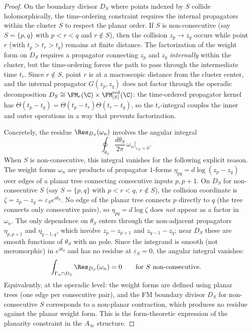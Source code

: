 \begin{proof}
On the boundary divisor $D_S$ where points indexed by $S$ collide holomorphically, the time-ordering constraint requires the internal propagators within the cluster $S$ to respect the planar order. If $S$ is non-consecutive (say $S = \{p, q\}$ with $p < r < q$ and $r \notin S$), then the collision $z_p \to z_q$ occurs while point $r$ (with $t_p > t_r > t_q$) remains at finite distance. The factorization of the weight form on $D_S$ requires a propagator connecting $z_p$ and $z_q$ \emph{internally} within the cluster, but the time-ordering forces the path to pass through the intermediate time $t_r$. Since $r \notin S$, point $r$ is at a macroscopic distance from the cluster center, and the internal propagator $G(z_p, z_q)$ does not factor through the operadic decomposition $D_S \cong \FM_r(\C) \times \FM_{|S|}^{\mathrm{red}}(\C)$: the time-ordered propagator kernel has $\Theta(t_p - t_q) = \Theta(t_p - t_r)\Theta(t_r - t_q)$, so the $t_r$-integral couples the inner and outer operations in a way that prevents factorization.

Concretely, the residue $\Res_{D_S}(\omega_n)$ involves the angular integral
\[
\oint_{\theta_S} \frac{d\theta_S}{2\pi}\, \omega_n\big|_{\varepsilon_S = 0}.
\]
When $S$ is non-consecutive, this integral vanishes for the following explicit reason. The weight forms $\omega_n$ are products of propagator $1$-forms $\eta_{pq} = d\log(z_p - z_q)$ over edges of a planar tree connecting consecutive inputs $p, p{+}1$. On $D_S$ for non-consecutive $S$ (say $S = \{p,q\}$ with $p < r < q$, $r \notin S$), the collision coordinate is $\zeta = z_p - z_q = \varepsilon_S e^{i\theta_S}$. No edge of the planar tree connects $p$ directly to $q$ (the tree connects only consecutive pairs), so $\eta_{pq} = d\log\zeta$ does \emph{not} appear as a factor in $\omega_n$. The only dependence on $\theta_S$ enters through the non-adjacent propagators $\eta_{p,p+1}$ and $\eta_{q-1,q}$, which involve $z_p - z_{p+1}$ and $z_{q-1} - z_q$; near $D_S$ these are smooth functions of $\theta_S$ with no pole. Since the integrand is smooth (not meromorphic) in $e^{i\theta_S}$ and has no residue at $\varepsilon_S = 0$, the angular integral vanishes:
\[
\int_{\Gamma_n \cap D_S} \Res_{D_S}(\omega_n) = 0 \qquad \text{for } S \text{ non-consecutive}.
\]
Equivalently, at the operadic level: the weight forms are defined using planar trees (one edge per consecutive pair), and the FM boundary divisor $D_S$ for non-consecutive $S$ corresponds to a non-planar contraction, which produces no residue against the planar weight form. This is the form-theoretic expression of the planarity constraint in the $A_\infty$ structure.


\end{proof}
